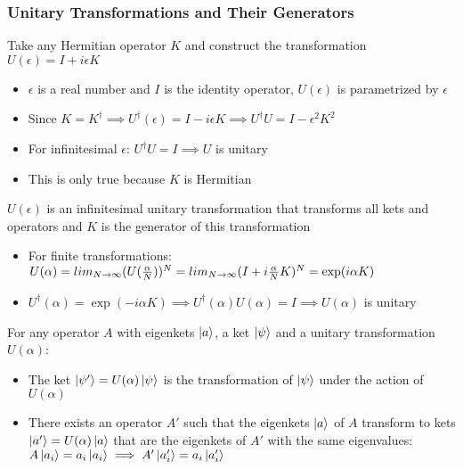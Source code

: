 \documentclass[8pt,t,mathserif,aspectratio=169]{beamer}
\begin{document}
\begin{frame}
  \frametitle{Unitary Transformations and Their Generators}
  \vspace{1mm}
  Take any Hermitian operator $K$ and construct the transformation $U(\epsilon) = I + i \epsilon K$
  \begin{itemize}
    \item $\epsilon$ is a real number and $I$ is the identity operator, $U(\epsilon)$ is parametrized by $\epsilon$
    \item Since $K = K^{\dagger} \implies U^{\dagger}(\epsilon) = I - i \epsilon K \implies U^{\dagger} U = I - \epsilon^2 K^2$
    \item For infinitesimal $\epsilon$: $U^{\dagger} U = I \implies U$ is unitary
    \item This is only true because $K$ is Hermitian
  \end{itemize}
  $U(\epsilon)$ is an infinitesimal unitary transformation that transforms all kets and operators and $K$ is the generator of this transformation
  \begin{itemize}
    \item For finite transformations: $U(\alpha) = lim_{N \to \infty} (U({\alpha \over N}))^{N} = lim_{N \to \infty} (I + i {\alpha \over N} K)^{N} = \exp(i \alpha K)$
    \item $U^{\dagger}(\alpha) = \exp(-i \alpha K) \implies U^{\dagger}(\alpha) U(\alpha) = I \implies U(\alpha)$ is unitary
  \end{itemize}
  For any operator $A$ with eigenkets $\ket{a}$, a ket $\ket{\psi}$ and a unitary transformation $U(\alpha)$:
  \begin{itemize}
    \item The ket $\ket{\psi'} = U(\alpha) \ket{\psi}$ is the transformation of $\ket{\psi}$ under the action of $U(\alpha)$
    \item There exists an operator $A'$ such that the eigenkets $\ket{a}$ of $A$ transform to kets $\ket{a'} = U(\alpha) \ket{a}$ that are the eigenkets of $A'$ with the same eigenvalues: $A \ket{a_i} = a_i \ket{a_i} \implies A' \ket{a_i'} = a_i \ket{a_i'}$
  \end{itemize}
\end{frame}
\end{document}
